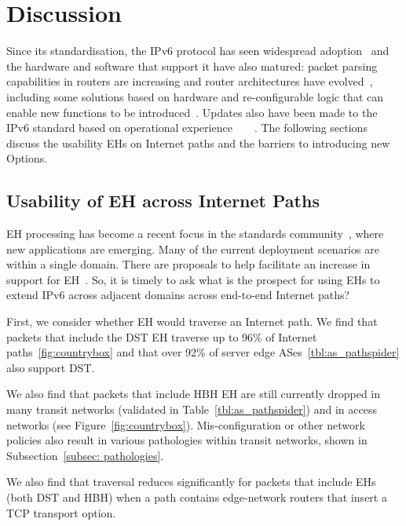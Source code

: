 \documentclass[conference]{IEEEtran}
\begin{document}
\section{Discussion} 
\label{sec:discussion}

Since its standardisation, the IPv6 protocol has
seen widespread adoption~\cite{v6adoption_ton} and the hardware and software that
support it have also matured: packet parsing capabilities in routers are increasing and
router architectures have evolved~\cite{metamorphosis, hauser2023}, including some solutions based on hardware and re-configurable
logic that can enable new functions to be introduced~\cite{cisco-silicon-one}. Updates also have been made to the IPv6 standard based on operational experience~\cite{RFC5722}~\cite{RFC6946}~\cite{RFC6564}~\cite{RFC8200}.
The following sections discuss the usability EHs on Internet paths and the barriers to introducing new Options.

\subsection{Usability of EH across Internet Paths}

EH processing has become a recent focus in the standards community~\cite {ietf-v6ops-hbh-03}, where new applications are emerging. Many of the current deployment scenarios are within a single domain. There are proposals to help facilitate an increase in support for EH~\cite{ietf-6man-HBH-processing-06, ietf-6man-eh-limits-02}. 
So, it is timely to ask what is the prospect for using EHs to extend IPv6 across adjacent domains across end-to-end Internet paths?

First, we consider whether EH would traverse an Internet path.
We find that packets that include the DST EH traverse up to 96\% of Internet paths~\ref{fig:countrybox} and that over 92\% of server edge ASes~\ref{tbl:as_pathspider} also support DST.

We also find that packets that include HBH EH are still currently dropped in many transit networks (validated in Table~\ref{tbl:as_pathspider}) and in access networks (see Figure~\ref{fig:countrybox}). Mis-configuration or other network policies also result in various pathologies within transit networks, shown in Subsection~\ref{subsec: pathologies}. 

We also find that traversal reduces significantly for packets that include EHs (both DST and HBH) when a path contains edge-network routers that insert a TCP transport option.
\end{document}
